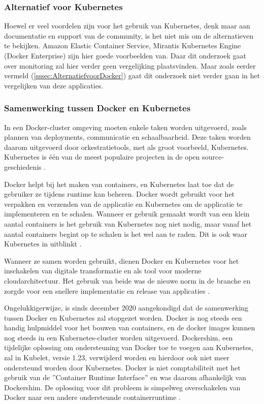 \subsubsection{Alternatief voor Kubernetes}
Hoewel er veel voordelen zijn voor het gebruik van Kubernetes, denk maar aan documentatie en support van de community, is het niet mis om de alternatieven te bekijken. Amazon Elastic Container Service, Mirantis Kubernetes Engine (Docker Enterprise) zijn hier goede voorbeelden van. Daar dit onderzoek gaat over monitoring zal hier verder geen vergelijking plaatsvinden. Maar zoals eerder vermeld (\ref{sssec:AlternatiefvoorDocker}) gaat dit onderzoek niet verder gaan in het vergelijken van deze applicaties. 
\clearpage
\subsubsection{Samenwerking tussen Docker en Kubernetes}
In een Docker-cluster omgeving moeten enkele taken worden uitgevoerd, zoals plannen van deployments, communicatie en schaalbaarheid. Deze taken worden daarom uitgevoerd door orkestratietools, met als groot voorbeeld, Kubernetes. Kubernetes is één van de meest populaire projecten in de open source-geschiedenis \autocite{Journal2020}.

Docker helpt bij het maken van containers, en Kubernetes laat toe dat de gebruiker ze tijdens runtime kan beheren. Docker wordt gebruikt voor het verpakken en verzenden van de applicatie en Kubernetes om de applicatie te implementeren en te schalen. Wanneer er gebruik gemaakt wordt van een klein aantal containers is het gebruik van Kubernetes nog niet nodig, maar vanaf het aantal containers begint op te schalen is het wel aan te raden. Dit is ook waar Kubernetes in uitblinkt \autocite{Journal2020}. 

Wanneer ze samen worden gebruikt, dienen Docker en Kubernetes voor het inschakelen van digitale transformatie en als tool voor moderne cloudarchitectuur. Het gebruik van beide was de nieuwe norm in de branche en zorgde voor een snellere implementatie en release van applicaties \autocite{Journal2020}. 

Ongelukkigerwijze, is sinds december 2020 aangekondigd dat de samenwerking tussen Docker en Kubernetes zal stopgezet worden. Docker is nog steeds een handig hulpmiddel voor het bouwen van containers, en de docker images kunnen nog steeds in een Kubernetes-cluster worden uitgevoerd. Dockershim, een tijdelijke oplossing om ondersteuning van Docker toe te voegen aan Kubernetes, zal in Kubelet, versie 1.23, verwijderd worden en hierdoor ook niet meer ondersteund worden door Kubernetes. Docker is niet comptabiliteit met het gebruik van de ''Container Runtime Interface'' en was daarom afhankelijk van Dockershim. De oplossing voor dit probleem is simpelweg overschakelen van Docker naar een andere ondersteunde containerruntime \autocite{Castro2020}. 

